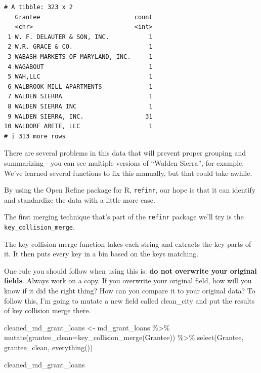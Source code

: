 \documentclass[
  letterpaper,
  DIV=11,
  numbers=noendperiod]{scrreprt}
\newenvironment{Shaded}{\begin{snugshade}}{\end{snugshade}}
\newcommand{\AttributeTok}[1]{\textcolor[rgb]{0.40,0.45,0.13}{#1}}
\newcommand{\FunctionTok}[1]{\textcolor[rgb]{0.28,0.35,0.67}{#1}}
\newcommand{\NormalTok}[1]{\textcolor[rgb]{0.00,0.23,0.31}{#1}}
\newcommand{\OtherTok}[1]{\textcolor[rgb]{0.00,0.23,0.31}{#1}}
\newcommand{\SpecialCharTok}[1]{\textcolor[rgb]{0.37,0.37,0.37}{#1}}
\begin{document}
\begin{verbatim}
# A tibble: 323 x 2
   Grantee                          count
   <chr>                            <int>
 1 W. F. DELAUTER & SON, INC.           1
 2 W.R. GRACE & CO.                     1
 3 WABASH MARKETS OF MARYLAND, INC.     1
 4 WAGABOUT                             1
 5 WAH,LLC                              1
 6 WALBROOK MILL APARTMENTS             1
 7 WALDEN SIERRA                        1
 8 WALDEN SIERRA INC                    1
 9 WALDEN SIERRA, INC.                 31
10 WALDORF ARETE, LLC                   1
# i 313 more rows
\end{verbatim}

There are several problems in this data that will prevent proper
grouping and summarizing - you can see multiple versions of ``Walden
Sierra'', for example. We've learned several functions to fix this
manually, but that could take awhile.

By using the Open Refine package for R, \texttt{refinr}, our hope is
that it can identify and standardize the data with a little more ease.

The first merging technique that's part of the \texttt{refinr} package
we'll try is the \texttt{key\_collision\_merge}.

The key collision merge function takes each string and extracts the key
parts of it. It then puts every key in a bin based on the keys matching.

One rule you should follow when using this is: \textbf{do not overwrite
your original fields}. Always work on a copy. If you overwrite your
original field, how will you know if it did the right thing? How can you
compare it to your original data? To follow this, I'm going to mutate a
new field called clean\_city and put the results of key collision merge
there.

\begin{Shaded}
\begin{Highlighting}[]
\NormalTok{cleaned\_md\_grant\_loans }\OtherTok{\textless{}{-}}\NormalTok{ md\_grant\_loans }\SpecialCharTok{\%\textgreater{}\%}
  \FunctionTok{mutate}\NormalTok{(}\AttributeTok{grantee\_clean=}\FunctionTok{key\_collision\_merge}\NormalTok{(Grantee)) }\SpecialCharTok{\%\textgreater{}\%}
  \FunctionTok{select}\NormalTok{(Grantee, grantee\_clean, }\FunctionTok{everything}\NormalTok{())}

\NormalTok{cleaned\_md\_grant\_loans}
\end{Highlighting}
\end{Shaded}
\end{document}
